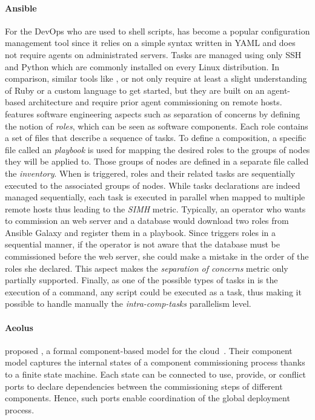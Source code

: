 \paragraph{Ansible}
For the DevOps who are used to shell scripts, \ansible has become a
popular configuration management tool since it relies on a simple
syntax written in YAML and does not require agents on administrated
servers. Tasks are managed using only SSH and
Python which are commonly installed on every Linux
distribution.  In comparison, similar tools like \chef, \puppet or
\cfengine not only require at least a slight understanding of Ruby or
a custom language to get started, but they are built on an agent-based
architecture and require prior agent commissioning on remote hosts.
\ansible features software engineering aspects such as separation of
concerns by defining the notion of \emph{roles}, which can be seen as
software components.  Each role contains a set of files that describe
a sequence of tasks. To define a composition, a specific file called
an \ansible \emph{playbook} is used for mapping the desired roles to
the groups of nodes they will be applied to. Those groups of nodes are
defined in a separate file called the \emph{inventory}. When \ansible
is triggered, roles and their related tasks are sequentially executed
to the associated groups of nodes. While tasks declarations are indeed
managed sequentially, each task is executed in parallel when mapped to
multiple remote hosts thus leading to the \emph{SIMH} metric.
Typically, an operator who wants to commission an \apache web server
and a \mysql database would download two roles from Ansible Galaxy and
register them in a playbook. Since \ansible triggers roles in a
sequential manner, if the operator is not aware that the database must
be commissioned before the web server, she could make a mistake in the
order of the roles she declared. This aspect makes the
\emph{separation of concerns} metric only partially
supported. Finally, as one of the possible types of tasks in \ansible
is the execution of a \shell command, any script could be executed as
a task, thus making it possible to handle manually the \emph{intra-comp-tasks}
parallelism level.


\paragraph{Aeolus}
\citeauthor{dicosmo2014ic} proposed \aeolus, a formal component-based
model for the cloud~\cite{dicosmo2014ic}. Their component model
captures the internal states of a component commissioning process
thanks to a finite state machine. Each state can be connected to use,
provide, or conflict ports to declare dependencies between the
commissioning steps of different components. Hence, such ports enable
coordination of the global deployment process.

